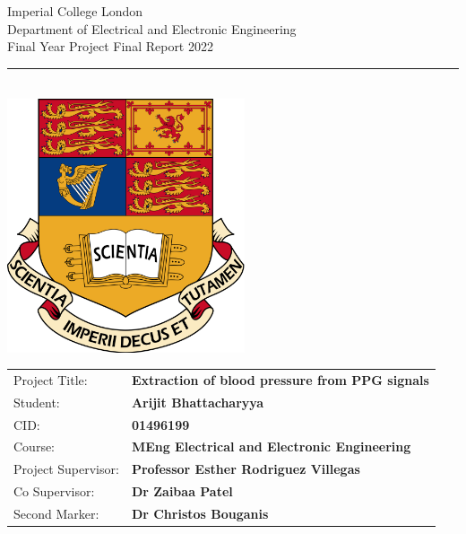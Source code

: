 \documentclass[11pt, a4paper]{article}
\begin{document}
\thispagestyle{empty}

\begin{titlepage}
\setlength{\parindent}{0pt}
\setlength{\parskip}{0pt}
{
    \Large
    \raggedright
    Imperial College London\\[17pt]
    Department of Electrical and Electronic Engineering\\[17pt]
    Final Year Project Final Report 2022\\[17pt]
}

\rule{\columnwidth}{3pt}
\vfill
    \begin{center}
    \quad\\[1.1cm]
    \includegraphics[width=7cm]{logo.png}\\[1cm]
    \end{center}\vfill
\setlength{\tabcolsep}{0pt}

\begin{tabular}{p{40mm}p{\dimexpr\columnwidth-40mm}}
    Project Title: & \textbf{Extraction of blood pressure from PPG signals} \\[12pt]
    Student: & \textbf{Arijit Bhattacharyya} \\[12pt]
    CID: & \textbf{01496199} \\[12pt]
    Course: & \textbf{MEng Electrical and Electronic Engineering} \\[12pt]
    Project Supervisor: & \textbf{Professor Esther Rodriguez Villegas} \\[12pt]
    Co Supervisor: & \textbf{Dr Zaibaa Patel} \\[12pt]
    Second Marker: & \textbf{Dr Christos Bouganis} \\[12pt]
\end{tabular}
\end{titlepage}
\end{document}
